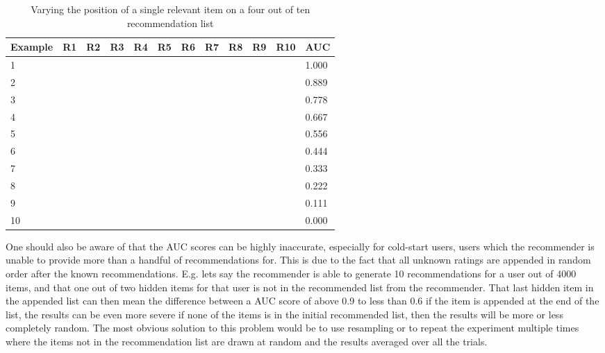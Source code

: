 \begin{table}[H]
\label{table:auc}
\centering
\begin{tabular}{|l|l|l|l|l|l|l|l|l|l|l|l|}
\hline
Example	& R1 & R2 & R3 & R4 & R5 & R6 & R7 & R8 & R9 & R10 & AUC										  \\ \hline
1		& \cmark & \xmark & \xmark & \xmark & \xmark & \xmark & \xmark & \xmark & \xmark & \xmark & 1.000 \\ \hline
2		& \xmark & \cmark & \xmark & \xmark & \xmark & \xmark & \xmark & \xmark & \xmark & \xmark & 0.889 \\ \hline
3		& \xmark & \xmark & \cmark & \xmark & \xmark & \xmark & \xmark & \xmark & \xmark & \xmark & 0.778 \\ \hline
4		& \xmark & \xmark & \xmark & \cmark & \xmark & \xmark & \xmark & \xmark & \xmark & \xmark & 0.667 \\ \hline
5		& \xmark & \xmark & \xmark & \xmark & \cmark & \xmark & \xmark & \xmark & \xmark & \xmark & 0.556 \\ \hline
6		& \xmark & \xmark & \xmark & \xmark & \xmark & \cmark & \xmark & \xmark & \xmark & \xmark & 0.444 \\ \hline
7		& \xmark & \xmark & \xmark & \xmark & \xmark & \xmark & \cmark & \xmark & \xmark & \xmark & 0.333 \\ \hline
8		& \xmark & \xmark & \xmark & \xmark & \xmark & \xmark & \xmark & \cmark & \xmark & \xmark & 0.222 \\ \hline
9		& \xmark & \xmark & \xmark & \xmark & \xmark & \xmark & \xmark & \xmark & \cmark & \xmark & 0.111 \\ \hline
10		& \xmark & \xmark & \xmark & \xmark & \xmark & \xmark & \xmark & \xmark & \xmark & \cmark & 0.000 \\
\hline
\end{tabular}
\caption{Varying the position of a single relevant item on a four out of ten recommendation list}
\end{table}

One should also be aware of that the AUC scores can be highly inaccurate, especially for cold-start users,
users which the recommender is unable to provide more than a handful of recommendations for. This is
due to the fact that all unknown ratings are appended in random order after the known recommendations.
E.g. lets say the recommender is able to generate 10 recommendations for a user out of 4000 items,
and that one out of two hidden items for that user is not in the recommended list from the recommender.
That last hidden item in the appended list can then mean the difference between a AUC score of above
0.9 to less than 0.6 if the item is appended at the end of the list, the results can be even more
severe if none of the items is in the initial recommended list, then the results will be more or less
completely random. The most obvious solution to this problem would be to use resampling or to repeat
the experiment multiple times where the items not in the recommendation list are drawn at random and
the results averaged over all the trials.

